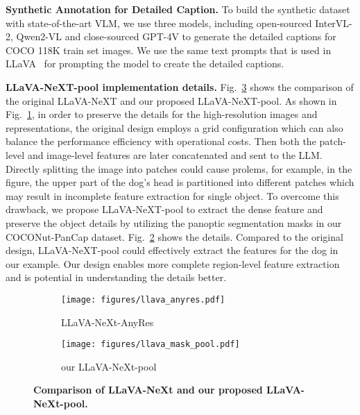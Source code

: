 \noindent\textbf{Synthetic Annotation for Detailed Caption.} To build the synthetic dataset with state-of-the-art VLM, we use three models, including open-sourced InterVL-2, Qwen2-VL and close-sourced GPT-4V to generate the detailed captions for COCO 118K train set images. We use the same text prompts that is used in LLaVA~\cite{liu2023llava} for prompting the model to create the detailed captions.

\noindent\textbf{LLaVA-NeXT-pool implementation details.} Fig.~\ref{fig:llava_arch} shows the comparison of the original LLaVA-NeXT and our proposed LLaVA-NeXT-pool. As shown in Fig.~\ref{fig:llava_anyres}, in order to preserve the details for the high-resolution images and representations, the original design employs a grid configuration which can also balance the performance efficiency with operational costs. Then both the patch-level and image-level features are later concatenated and sent to the LLM. Directly splitting the image into patches could cause prolems, for example, in the figure, the upper part of the dog's head is partitioned into different patches which may result in incomplete feature extraction for single object. To overcome this drawback, we propose LLaVA-NeXT-pool to extract the dense feature and preserve the object details by utilizing the panoptic segmentation masks in our COCONut-PanCap dataset. Fig.~\ref{fig:llava_pool} shows the details. Compared to the original design, LLaVA-NeXT-pool could effectively extract the features for the dog in our example. Our design enables more complete region-level feature extraction and is potential in understanding the details better.




\begin{figure}[t!]
    \centering
    \begin{subfigure}[b]{0.49\textwidth}
        \centering
        \texttt{[image: figures/llava\_anyres.pdf]}
        \caption{LLaVA-NeXt-AnyRes}
        \label{fig:llava_anyres}
    \end{subfigure}
    \hfill
    \begin{subfigure}[b]{0.49\textwidth}
        \centering
        \texttt{[image: figures/llava\_mask\_pool.pdf]}
        \caption{our LLaVA-NeXt-pool}
        \label{fig:llava_pool}
    \end{subfigure}
    \caption{\textbf{Comparison of LLaVA-NeXt and our proposed LLaVA-NeXt-pool.}
    }
    \label{fig:llava_arch}
\end{figure}

